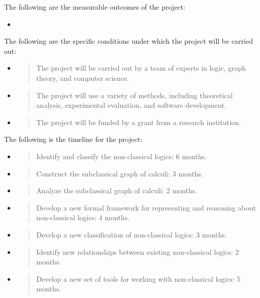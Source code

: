 The following are the measurable outcomes of the project:

\begin{itemize}
\tightlist
\item
\end{itemize}

The following are the specific conditions under which the project will
be carried out:

\begin{itemize}
\item
  \begin{quote}
  The project will be carried out by a team of experts in logic, graph
  theory, and computer science.
  \end{quote}
\item
  \begin{quote}
  The project will use a variety of methods, including theoretical
  analysis, experimental evaluation, and software development.
  \end{quote}
\item
  \begin{quote}
  The project will be funded by a grant from a research institution.
  \end{quote}
\end{itemize}

The following is the timeline for the project:

\begin{itemize}
\item
  \begin{quote}
  Identify and classify the non-classical logics: 6 months.
  \end{quote}
\item
  \begin{quote}
  Construct the subclassical graph of calculi: 3 months.
  \end{quote}
\item
  \begin{quote}
  Analyze the subclassical graph of calculi: 2 months.
  \end{quote}
\item
  \begin{quote}
  Develop a new formal framework for representing and reasoning about
  non-classical logics: 4 months.
  \end{quote}
\item
  \begin{quote}
  Develop a new classification of non-classical logics: 3 months.
  \end{quote}
\item
  \begin{quote}
  Identify new relationships between existing non-classical logics: 2
  months.
  \end{quote}
\item
  \begin{quote}
  Develop a new set of tools for working with non-classical logics: 5
  months.
  \end{quote}
\end{itemize}

